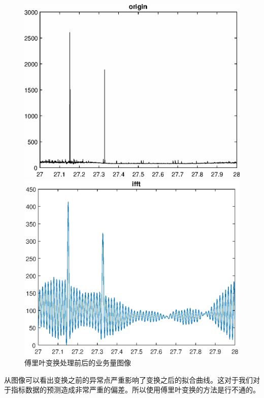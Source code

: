 \documentclass[a4paper]{article}
\begin{document}
\begin{figure}[h]
	\begin{minipage}[t]{0.5\linewidth}
    \centering
    \includegraphics[scale=0.4]{pic/before_friouer.eps}
    \end{minipage}
    \begin{minipage}[t]{0.5\linewidth}
    \centering 
	\includegraphics[scale=0.4]{pic/friouer.eps}
    \end{minipage}
	\caption{傅里叶变换处理前后的业务量图像}
     \label{fig:char}
\end{figure}
从图像可以看出变换之前的异常点严重影响了变换之后的拟合曲线。这对于我们对于指标数据的预测造成非常严重的偏差。所以使用傅里叶变换的方法是行不通的。
\end{document}
